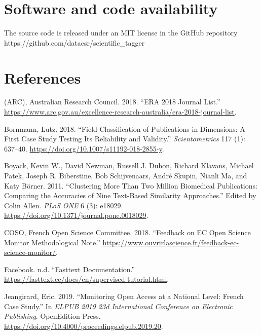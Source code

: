 \documentclass[
]{article}
\newlength{\cslhangindent}
\newenvironment{cslreferences}%
  {\setlength{\parindent}{0pt}%
  \everypar{\setlength{\hangindent}{\cslhangindent}}\ignorespaces}%
  {\par}
\begin{document}
\hypertarget{software-and-code-availability}{%
\section{Software and code
availability}\label{software-and-code-availability}}

The source code is released under an MIT license in the GitHub
repository https://github.com/dataesr/scientific\_tagger

\hypertarget{references}{%
\section*{References}\label{references}}

\hypertarget{refs}{}
\begin{cslreferences}
\leavevmode\hypertarget{ref-australian_research_council_arc_era_2018}{}%
(ARC), Australian Research Council. 2018. ``ERA 2018 Journal List.''
\url{https://www.arc.gov.au/excellence-research-australia/era-2018-journal-list}.

\leavevmode\hypertarget{ref-bornmann_field_2018}{}%
Bornmann, Lutz. 2018. ``Field Classification of Publications in
Dimensions: A First Case Study Testing Its Reliability and Validity.''
\emph{Scientometrics} 117 (1): 637--40.
\url{https://doi.org/10.1007/s11192-018-2855-y}.

\leavevmode\hypertarget{ref-boyack_clustering_2011}{}%
Boyack, Kevin W., David Newman, Russell J. Duhon, Richard Klavans,
Michael Patek, Joseph R. Biberstine, Bob Schijvenaars, André Skupin,
Nianli Ma, and Katy Börner. 2011. ``Clustering More Than Two Million
Biomedical Publications: Comparing the Accuracies of Nine Text-Based
Similarity Approaches.'' Edited by Colin Allen. \emph{PLoS ONE} 6 (3):
e18029. \url{https://doi.org/10.1371/journal.pone.0018029}.

\leavevmode\hypertarget{ref-coso_feedback_2018}{}%
COSO, French Open Science Committee. 2018. ``Feedback on EC Open Science
Monitor Methodological Note.''
\url{https://www.ouvrirlascience.fr/feedback-ec-science-monitor/}.

\leavevmode\hypertarget{ref-facebook_fasttext_nodate}{}%
Facebook. n.d. ``Fasttext Documentation.''
\url{https://fasttext.cc/docs/en/supervised-tutorial.html}.

\leavevmode\hypertarget{ref-jeangirard_monitoring_2019}{}%
Jeangirard, Eric. 2019. ``Monitoring Open Access at a National Level:
French Case Study.'' In \emph{ELPUB 2019 23d International Conference on
Electronic Publishing}. OpenEdition Press.
\url{https://doi.org/10.4000/proceedings.elpub.2019.20}.


\end{cslreferences}
\end{document}
